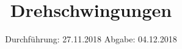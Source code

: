 

\subject{V102}
\title{Drehschwingungen}
\date{%
  Durchführung: 27.11.2018
  \hspace{3em}
  Abgabe: 04.12.2018
}



\maketitle
\thispagestyle{empty}





\nocite{V102}

\printbibliography{}


